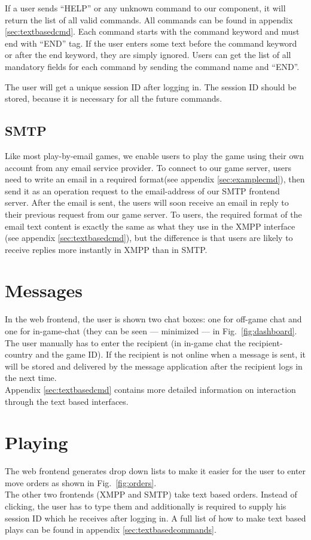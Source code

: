 \documentclass[11pt,a4paper]{report}
\begin{document}
If a user sends  ``HELP'' or any unknown command to our component, it will
return the list of all valid commands. All commands can be found in appendix
\ref{sec:textbasedcmd}.
Each command starts with the command keyword and must end with ``END'' tag.
If the user enters some text before the command keyword or after the end
keyword, they are simply ignored. Users can get the list of all mandatory fields
for each command by sending the command name and ``END''.

The user will get a unique session ID after logging in. The session ID should be
stored, because it is necessary for all the future commands.

\subsection{SMTP}
Like most play-by-email games, we enable users to play the game using their own
account from any email service provider.
To connect to our game server, users need to write an email in a required
format(see appendix \ref{sec:examplecmd}),
then send it as an operation request to the email-address of our SMTP frontend
server. After the email is sent, the users will soon receive an email in reply
to their previous request from our game server. To users, the required format
of the email text content is exactly the same as what they use in the XMPP
interface (see appendix \ref{sec:textbasedcmd}), but the difference is that
users are likely to receive replies more instantly in XMPP than in SMTP.

\section{Messages}
In the web frontend, the user is shown two chat boxes: one for off-game chat
and one for in-game-chat (they can be seen --- minimized --- in
Fig.~\ref{fig:dashboard}. The user manually has to enter the recipient (in
in-game chat the recipient-country and the game ID). If the recipient is not
online when a message is sent, it will be stored and delivered by the message
application after the recipient logs in the next time. \\
Appendix \ref{sec:textbasedcmd} contains more detailed information on
interaction through the text based interfaces.

\section{Playing}
The web frontend generates drop down lists to make it easier for the user to
enter move orders as shown in Fig.~\ref{fig:orders}. \\
The other two frontends (XMPP and SMTP) take text based orders. Instead of
clicking, the user has to type them and additionally is required to supply
his session ID which he receives after logging in.
A full list of how to make text based plays can be found in appendix
\ref{sec:textbasedcommands}.
\end{document}
